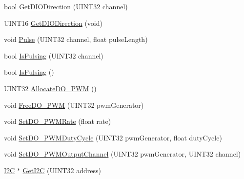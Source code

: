 \begin{DoxyCompactItemize}
\item 
bool \hyperlink{classDigitalModule_a4d3a7e90d5cca4e77c745865683b2957}{\-Get\-D\-I\-O\-Direction} (\-U\-I\-N\-T32 channel)
\item 
\-U\-I\-N\-T16 \hyperlink{classDigitalModule_ace6f6291bc6772c4824d41ca4091570e}{\-Get\-D\-I\-O\-Direction} (void)
\item 
void \hyperlink{classDigitalModule_a3651d475c592ed0330cfb08d1de00bc8}{\-Pulse} (\-U\-I\-N\-T32 channel, float pulse\-Length)
\item 
bool \hyperlink{classDigitalModule_affabf884db92ab9290189cff53003480}{\-Is\-Pulsing} (\-U\-I\-N\-T32 channel)
\item 
bool \hyperlink{classDigitalModule_a16bfc42defa1aab106cfbc6fd722b28f}{\-Is\-Pulsing} ()
\item 
\-U\-I\-N\-T32 \hyperlink{classDigitalModule_a7289f380a40fa407f9b31f81fb8ed0f3}{\-Allocate\-D\-O\-\_\-\-P\-W\-M} ()
\item 
void \hyperlink{classDigitalModule_a7e388e508e7de68a06868a127670a9da}{\-Free\-D\-O\-\_\-\-P\-W\-M} (\-U\-I\-N\-T32 pwm\-Generator)
\item 
void \hyperlink{classDigitalModule_a3419b44d9ab72e95df6c0917e5e7db72}{\-Set\-D\-O\-\_\-\-P\-W\-M\-Rate} (float rate)
\item 
void \hyperlink{classDigitalModule_a74d6d4ae310213e91891de4b8940b917}{\-Set\-D\-O\-\_\-\-P\-W\-M\-Duty\-Cycle} (\-U\-I\-N\-T32 pwm\-Generator, float duty\-Cycle)
\item 
void \hyperlink{classDigitalModule_ac9b8da9267956e905c9083dcfb6b4a8f}{\-Set\-D\-O\-\_\-\-P\-W\-M\-Output\-Channel} (\-U\-I\-N\-T32 pwm\-Generator, \-U\-I\-N\-T32 channel)
\item 
\hyperlink{classI2C}{\-I2\-C} $\ast$ \hyperlink{classDigitalModule_ae776c8449cf18b7f90fec0126b3e8373}{\-Get\-I2\-C} (\-U\-I\-N\-T32 address)
\end{DoxyCompactItemize}
